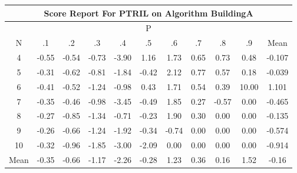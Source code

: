 \documentclass[11pt,a4paper]{report}
\begin{document}
\begin{longtable}{ | c || c | c | c | c | c | c | c | c | c || c |}
\hline
\multicolumn{11}{|c|}{ Score Report For PTRIL on Algorithm BuildingA} \\
\hline
\multicolumn{11}{|c|}{ P } \\
\hline
N & .1 & .2 & .3 & .4 & .5 & .6 & .7 & .8 & .9 & Mean\\
 \hline
 \hline
 \endhead
  4 &  \cellcolor[HTML]{FFEFEF} -0.55 &  \cellcolor[HTML]{FFEFEF} -0.54 &  \cellcolor[HTML]{FFEFEF} -0.73 &  \cellcolor[HTML]{FF9F9F} -3.90 &  \cellcolor[HTML]{DFDFFF} 1.16 &  \cellcolor[HTML]{D7D7FF} 1.73 &  \cellcolor[HTML]{EFEFFF} 0.65 &  \cellcolor[HTML]{EFEFFF} 0.73 &  \cellcolor[HTML]{EFEFFF} 0.48 & -0.107 \\
  5 &  \cellcolor[HTML]{FFF7F7} -0.31 &  \cellcolor[HTML]{FFEFEF} -0.62 &  \cellcolor[HTML]{FFE7E7} -0.81 &  \cellcolor[HTML]{FFCFCF} -1.84 &  \cellcolor[HTML]{FFF7F7} -0.42 &  \cellcolor[HTML]{C7C7FF} 2.12 &  \cellcolor[HTML]{EFEFFF} 0.77 &  \cellcolor[HTML]{EFEFFF} 0.57 &  \cellcolor[HTML]{F7F7FF} 0.18 & -0.039 \\
  6 &  \cellcolor[HTML]{FFF7F7} -0.41 &  \cellcolor[HTML]{FFEFEF} -0.52 &  \cellcolor[HTML]{FFDFDF} -1.24 &  \cellcolor[HTML]{FFE7E7} -0.98 &  \cellcolor[HTML]{F7F7FF} 0.43 &  \cellcolor[HTML]{D7D7FF} 1.71 &  \cellcolor[HTML]{EFEFFF} 0.54 &  \cellcolor[HTML]{F7F7FF} 0.39 &  \cellcolor[HTML]{0808FF} 10.00 & 1.101 \\
  7 &  \cellcolor[HTML]{FFF7F7} -0.35 &  \cellcolor[HTML]{FFF7F7} -0.46 &  \cellcolor[HTML]{FFE7E7} -0.98 &  \cellcolor[HTML]{FFA7A7} -3.45 &  \cellcolor[HTML]{FFEFEF} -0.49 &  \cellcolor[HTML]{CFCFFF} 1.85 &  \cellcolor[HTML]{F7F7FF} 0.27 &  \cellcolor[HTML]{FFEFEF} -0.57 &  \cellcolor[HTML]{FFFFFF} 0.00 & -0.465 \\
  8 &  \cellcolor[HTML]{FFF7F7} -0.27 &  \cellcolor[HTML]{FFE7E7} -0.85 &  \cellcolor[HTML]{FFDFDF} -1.34 &  \cellcolor[HTML]{FFEFEF} -0.71 &  \cellcolor[HTML]{FFF7F7} -0.23 &  \cellcolor[HTML]{CFCFFF} 1.90 &  \cellcolor[HTML]{F7F7FF} 0.30 &  \cellcolor[HTML]{FFFFFF} 0.00 &  \cellcolor[HTML]{FFFFFF} 0.00 & -0.135 \\
  9 &  \cellcolor[HTML]{FFF7F7} -0.26 &  \cellcolor[HTML]{FFEFEF} -0.66 &  \cellcolor[HTML]{FFDFDF} -1.24 &  \cellcolor[HTML]{FFCFCF} -1.92 &  \cellcolor[HTML]{FFF7F7} -0.34 &  \cellcolor[HTML]{FFEFEF} -0.74 &  \cellcolor[HTML]{FFFFFF} 0.00 &  \cellcolor[HTML]{FFFFFF} 0.00 &  \cellcolor[HTML]{FFFFFF} 0.00 & -0.574 \\
  10 &  \cellcolor[HTML]{FFF7F7} -0.32 &  \cellcolor[HTML]{FFE7E7} -0.96 &  \cellcolor[HTML]{FFCFCF} -1.85 &  \cellcolor[HTML]{FFB7B7} -3.00 &  \cellcolor[HTML]{FFC7C7} -2.09 &  \cellcolor[HTML]{FFFFFF} 0.00 &  \cellcolor[HTML]{FFFFFF} 0.00 &  \cellcolor[HTML]{FFFFFF} 0.00 &  \cellcolor[HTML]{FFFFFF} 0.00 & -0.914 \\
 \hline
 \hline
Mean &  \cellcolor[HTML]{FFF7F7} -0.35 &  \cellcolor[HTML]{FFEFEF} -0.66 &  \cellcolor[HTML]{FFDFDF} -1.17 &  \cellcolor[HTML]{FFC7C7} -2.26 &  \cellcolor[HTML]{FFF7F7} -0.28 &  \cellcolor[HTML]{DFDFFF} 1.23 &  \cellcolor[HTML]{F7F7FF} 0.36 &  \cellcolor[HTML]{F7F7FF} 0.16 &  \cellcolor[HTML]{D7D7FF} 1.52 &  \cellcolor[HTML]{FFF7F7} -0.16
\end{longtable}
\end{document}
